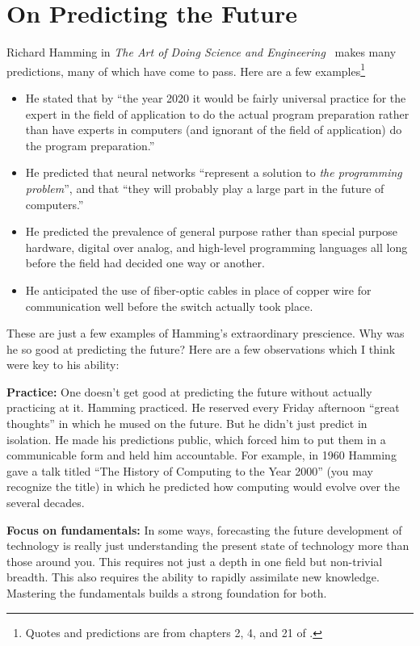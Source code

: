 \section{On Predicting the Future}
\label{sec:predicting_future}

Richard Hamming in \emph{The Art of
Doing Science and Engineering}~\citep{hamming1997art} makes many predictions,
many of which have come to pass. Here are a few examples\footnote{Quotes and
predictions are from chapters 2, 4, and 21 of \citet{hamming1997art}.}
\begin{itemize}
    \item He stated that by ``the year 2020 it would be fairly universal
        practice for the expert in the field of application to do the actual
        program preparation rather than have experts in computers (and ignorant
        of the field of application) do the program preparation.''
    \item He predicted that neural networks ``represent a solution to \emph{the
        programming problem}'', and that ``they will probably play a large part
        in the future of computers.''
    \item He predicted the prevalence of general purpose rather than special
        purpose hardware, digital over analog, and high-level programming
        languages all long before the field had decided one way or another.
    \item He anticipated the use of fiber-optic cables in place of copper wire
        for communication well before the switch actually took place.
\end{itemize}

These are just a few examples of Hamming's extraordinary prescience. Why was he
so good at predicting the future? Here are a few observations which I think
were key to his ability:

{\bf Practice:} One doesn't get good at predicting the future without actually
practicing at it. Hamming practiced. He reserved every Friday afternoon ``great
thoughts'' in which he mused on the future. But he didn't just predict in
isolation. He made his predictions public, which forced him to put them in a
communicable form and held him accountable. For example, in 1960 Hamming gave a
talk titled ``The History of Computing to the Year 2000'' (you may recognize
the title) in which he predicted how computing would evolve over the several
decades.

{\bf Focus on fundamentals:} In some ways, forecasting the future development
of technology is really just understanding the present state of technology more
than those around you. This requires not just a depth in one field but
non-trivial breadth. This also requires the ability to rapidly assimilate new
knowledge. Mastering the fundamentals builds a strong foundation for both.

